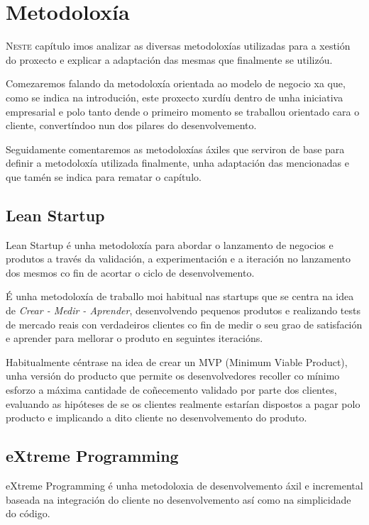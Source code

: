\chapter{Metodoloxía}
\minitoc


  \lettrine{N}{este} capítulo imos analizar as diversas metodoloxías utilizadas para a 
xestión do proxecto e explicar a adaptación das mesmas que finalmente se utilizóu.

  Comezaremos falando da metodoloxía orientada ao modelo de negocio xa que, 
como se indica na introdución, este proxecto xurdíu dentro de unha iniciativa 
empresarial e polo tanto dende o primeiro momento se traballou orientado cara o 
cliente, convertíndoo nun dos pilares do desenvolvemento.

  Seguidamente comentaremos as metodoloxías áxiles que serviron de base para 
definir a metodoloxía utilizada finalmente, unha adaptación das mencionadas e 
que tamén se indica para rematar o capítulo.

  \section{Lean Startup}
  Lean Startup\cite{book:leanstartup} é unha metodoloxía para abordar o 
lanzamento de negocios e produtos a través da validación, a experimentación e a 
iteración no lanzamento dos mesmos co fin de acortar o ciclo de desenvolvemento.

  É unha metodoloxía de traballo moi habitual nas startups que se centra na 
idea de \emph{Crear - Medir - Aprender}, desenvolvendo pequenos produtos e 
realizando tests de mercado reais con verdadeiros clientes co fin de medir o 
seu grao de satisfación e aprender para mellorar o produto en seguintes 
iteracións.

  Habitualmente céntrase na idea de crear un MVP (Minimum Viable Product), 
unha versión do producto que permite os desenvolvedores recoller co mínimo 
esforzo a máxima cantidade de coñecemento validado por parte dos clientes, 
evaluando as hipóteses de se os clientes realmente estarían dispostos a pagar 
polo producto e implicando a dito cliente no desenvolvemento do produto.

  \section{eXtreme Programming}
  eXtreme Programming\cite{book:agile} é unha metodoloxia de desenvolvemento 
áxil e incremental baseada na integración do cliente no desenvolvemento así como 
na simplicidade do código.

